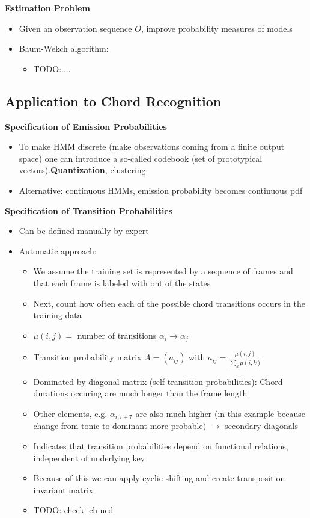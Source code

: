 \documentclass{scrartcl}
\newcommand{\ffrac}[2]{\ensuremath{\frac{\displaystyle #1}{\displaystyle #2}}}
\begin{document}
\textbf{Estimation Problem}
\begin{itemize}
    \item
        Given an observation sequence $O$, improve probability measures of models
    \item
        Baum-Wekch algorithm:
        \begin{itemize}
            \item
                TODO:....
        \end{itemize}
\end{itemize}
\subsection*{Application to Chord Recognition}
\textbf{Specification of Emission Probabilities}
\begin{itemize}
    \item
        To make HMM discrete (make observations coming from a finite output space) one can introduce a so-called codebook (set of prototypical vectors).\textbf{Quantization}, clustering
    \item
        Alternative: continuous HMMs, emission probability becomes continuous pdf
\end{itemize}
\textbf{Specification of Transition Probabilities}
\begin{itemize}
    \item
        Can be defined manually by expert
    \item
        Automatic approach:
        \begin{itemize}
            \item
                We assume the training set is represented by a sequence of frames and that each frame is labeled with ont of the states
            \item
                Next, count how often each of the possible chord transitions occurs in the training data
            \item
                $\mu(i,j) = $ number of transitions $\alpha_i \rightarrow \alpha_j$
            \item
                Transition probability matrix $A = (a_{ij})$ with $a_{ij} = \ffrac{\mu(i,j)}{\sum_k \mu(i,k)}$
            \item
                Dominated by diagonal matrix (self-transition probabilities): Chord durations occuring are much longer than the frame length
            \item
                Other elements, e.g. $\alpha_{i, i+7}$ are also much higher (in this example because change from tonic to dominant more probable) $\rightarrow$ secondary diagonals
            \item
                Indicates that transition probabilities depend on functional relations, independent of underlying key
            \item
                Because of this we can apply cyclic shifting and create transposition invariant matrix
            \item
                TODO: check ich ned
        \end{itemize}
\end{itemize}
\end{document}
